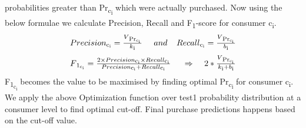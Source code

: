 probabilities greater than Pr\textsubscript{c\textsubscript{i}} which were actually purchased. Now using the below 
formulae we calculate Precision, Recall and F\textsubscript{1}-score for consumer c\textsubscript{i}.
  \begin{equation}
    \begin{array}{l}
      Precision\textsubscript{c\textsubscript{i}}= \frac{V\textsubscript{Pr\textsubscript{c\textsubscript{i}}}} {k\textsubscript{i}}
      \;\;\;\;\;and\;\;\;\;
      Recall\textsubscript{c\textsubscript{i}}= \frac{V\textsubscript{Pr\textsubscript{c\textsubscript{i}}}} {b\textsubscript{i}}
    \end{array}
    \label{eqn:F1}
  \end{equation}
  \begin{equation}
    \begin{array}{l}
      F\textsubscript{1\textsubscript{c\textsubscript{i}}} = \frac{2 \times Precision\textsubscript{c\textsubscript{i}} 
      \times Recall\textsubscript{c\textsubscript{i}}} 
      {Precision\textsubscript{c\textsubscript{i}} + Recall\textsubscript{c\textsubscript{i}}}
      \;
      \;\;\;\;\Rightarrow	\;\;\;\;
      2 * 
      \frac{
        V\textsubscript{Pr\textsubscript{c\textsubscript{i}}}
      }
      {
        k\textsubscript{i} + b\textsubscript{i}
      }
    \end{array}
    \label{eqn:Optimizer}
  \end{equation}
F\textsubscript{1\textsubscript{c\textsubscript{i}}} becomes the value to be maximised
by finding optimal Pr\textsubscript{c\textsubscript{i}} for consumer c\textsubscript{i}.
We apply the above Optimization function over test1 probability distribution 
at a consumer level to find optimal cut-off. Final purchase predictions happens 
based on the cut-off value.